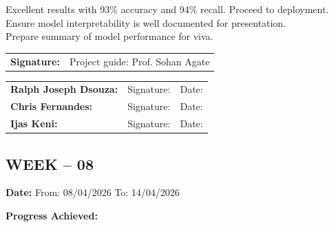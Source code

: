 \documentclass[12pt,a4paper]{article}
\begin{document}
\medskip

\noindent Excellent results with 93\% accuracy and 94\% recall. Proceed to deployment. \\
Ensure model interpretability is well documented for presentation. \\
Prepare summary of model performance for viva.

\medskip

\noindent\begin{tabular}{p{4cm} p{6cm}}
\textbf{Signature:} & Project guide: Prof. Sohan Agate \\
\end{tabular}

\medskip

\noindent\begin{tabular}{p{3.5cm} p{5cm} p{3cm}}
\textbf{Ralph Joseph Dsouza:} & Signature: \underline{\hspace{4cm}} & Date: \underline{\hspace{2cm}} \\
\textbf{Chris Fernandes:} & Signature: \underline{\hspace{4cm}} & Date: \underline{\hspace{2cm}} \\
\textbf{Ijas Keni:} & Signature: \underline{\hspace{4cm}} & Date: \underline{\hspace{2cm}} \\
\end{tabular}

\newpage

\subsection*{WEEK – 08}
\vspace{0.3cm}

\textbf{Date:} From: 08/04/2026 To: 14/04/2026

\medskip

\noindent\textbf{Progress Achieved:}

\medskip
\end{document}
